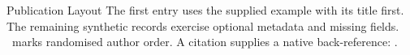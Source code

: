 \documentclass[british,a4paper,11pt]{article}
\begin{document}
\begin{cvsection}{Publication Layout}
  The first entry uses the supplied example with its title first. The remaining
  synthetic records exercise optional metadata and missing fields.
  \cvauthorshiplegend\ marks randomised author order.
  \nocite{clark-wilson}
  A citation supplies a native back-reference: \cite{article-eid}.
  \nocite{*}
  \printbibliography[heading=none]
\end{cvsection}
\end{document}
